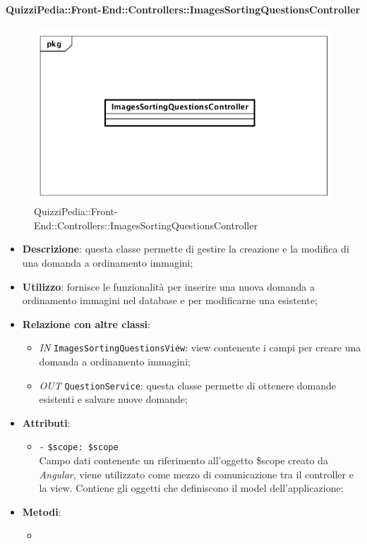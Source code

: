 \paragraph{QuizziPedia::Front-End::Controllers::ImagesSortingQuestionsController}
\begin{figure}
	\centering
	\includegraphics[scale=0.45]{UML/Classi/Front-End/QuizziPedia_Front-end_Controller_ImagesSortingQuestionsController.png}
	\caption{QuizziPedia::Front-End::Controllers::ImagesSortingQuestionsController}
\end{figure}
\begin{itemize}
	\item \textbf{Descrizione}: questa classe permette di gestire la creazione e la modifica di una domanda a ordinamento immagini;
	\item \textbf{Utilizzo}: fornisce le funzionalità per inserire una nuova domanda a ordinamento immagini nel database e per modificarne una esistente;
	\item \textbf{Relazione con altre classi}:
	\begin{itemize}
		\item \textit{IN} \texttt{ImagesSortingQuestionsView}: view contenente i campi per creare una domanda a ordinamento immagini; 
		\item \textit{OUT} \texttt{QuestionService}: questa classe permette di ottenere domande esistenti e salvare nuove domande;
	\end{itemize}
	\item \textbf{Attributi}:
	\begin{itemize}
		\item \texttt{-} \texttt{\$scope: \$scope} \\
		Campo dati contenente un riferimento all’oggetto \$scope creato da \textit{Angular}, viene utilizzato come mezzo di comunicazione tra il controller e la view. Contiene gli oggetti che definiscono il model dell’applicazione;
	\end{itemize}
	\item \textbf{Metodi}:
	\begin{itemize}
		\item 
	\end{itemize}
\end{itemize}

